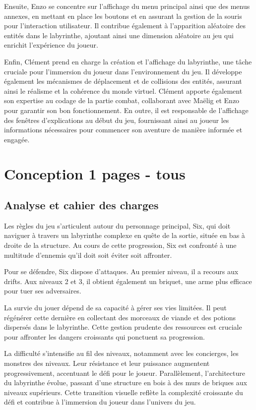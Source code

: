 \documentclass[10pt]{article}
\begin{document}
Ensuite, Enzo se concentre sur l'affichage du menu principal ainsi que des menus annexes, en mettant en place les boutons et en assurant la gestion de la souris pour l'interaction utilisateur. Il contribue également à l'apparition aléatoire des entités dans le labyrinthe, ajoutant ainsi une dimension aléatoire au jeu qui enrichit l'expérience du joueur.

Enfin, Clément prend en charge la création et l'affichage du labyrinthe, une tâche cruciale pour l'immersion du joueur dans l'environnement du jeu. Il développe également les mécanismes de déplacement et de collisions des entités, assurant ainsi le réalisme et la cohérence du monde virtuel. Clément apporte également son expertise au codage de la partie combat, collaborant avec Maëlig et Enzo pour garantir son bon fonctionnement. En outre, il est responsable de l'affichage des fenêtres d'explications au début du jeu, fournissant ainsi au joueur les informations nécessaires pour commencer son aventure de manière informée et engagée.


   \clearpage
\section{Conception 1 pages - tous}
\subsection{Analyse et cahier des charges}
Les règles du jeu s'articulent autour du personnage principal, Six, qui doit naviguer à travers un \gls{labyrinthe} complexe en quête de la sortie, située en bas à droite de la structure. Au cours de cette progression, Six est confronté à une multitude d'\gls{ennemis} qu'il doit soit éviter soit affronter.

Pour se défendre, Six dispose d'attaques. Au premier niveau, il a recours aux \gls{drifts}. Aux niveaux 2 et 3, il obtient également un \gls{briquet}, une arme plus efficace pour tuer ses adversaires.

La survie du jouer dépend de sa capacité à gérer ses vies limitées. Il peut régénérer cette dernière en collectant des morceaux de viande et des potions dispersés dans le labyrinthe. Cette gestion prudente des ressources est cruciale pour affronter les dangers croissants qui ponctuent sa progression.

La difficulté s'intensifie au fil des niveaux, notamment avec les \gls{concierges}, les monstres des niveaux. Leur résistance et leur puissance augmentent progressivement, accentuant le défi pour le joueur. Parallèlement, l'architecture du labyrinthe évolue, passant d'une structure en bois à des murs de briques aux niveaux supérieurs. Cette transition visuelle reflète la complexité croissante du défi et contribue à l'immersion du joueur dans l'univers du jeu.
\end{document}
